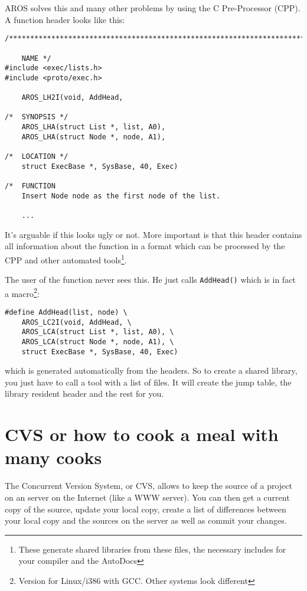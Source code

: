 AROS solves this and many other problems by using the C Pre-Processor (CPP).
A function header looks like this:

\begin{verbatim}
/***************************************************************************

    NAME */
#include <exec/lists.h>
#include <proto/exec.h>

	AROS_LH2I(void, AddHead,

/*  SYNOPSIS */
	AROS_LHA(struct List *, list, A0),
	AROS_LHA(struct Node *, node, A1),

/*  LOCATION */
	struct ExecBase *, SysBase, 40, Exec)

/*  FUNCTION
	Insert Node node as the first node of the list.

	...
\end{verbatim}

It's arguable if this looks ugly or not. More important is that this header
contains all information about the function in a format which can be
processed by the CPP and other automated tools\footnote{These generate
shared libraries from these files, the necessary includes for your
compiler and the AutoDocs}.

The user of the function never sees this. He just calls \verb.AddHead().
which is in fact a macro\footnote{Version for Linux/i386 with GCC. Other
systems look different}:

\begin{verbatim}
#define AddHead(list, node) \
    AROS_LC2I(void, AddHead, \
    AROS_LCA(struct List *, list, A0), \
    AROS_LCA(struct Node *, node, A1), \
    struct ExecBase *, SysBase, 40, Exec)
\end{verbatim}

which is generated automatically from the headers. So to create a shared
library, you just have to call a tool with a list of files. It will create
the jump table, the library resident header and the rest for you.

\section{CVS or how to cook a meal with many cooks}

The Concurrent Version System, or CVS, allows to keep the source of a
project on an server on the Internet (like a WWW server). You can then get
a current copy of the source, update your local copy, create a list of
differences between your local copy and the sources on the server as well
as commit your changes.

